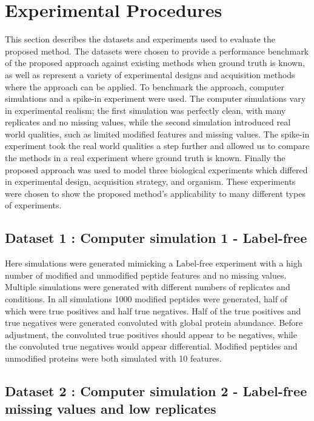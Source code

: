 \documentclass[mcp]{article}
\numberwithin{table}{section}
\begin{document}
\section{Experimental Procedures}

This section describes the datasets and experiments used to evaluate the proposed method. The datasets were chosen to provide a performance benchmark of the proposed approach against existing methods when ground truth is known, as well as represent a variety of experimental designs and acquisition methods where the approach can be applied. To benchmark the approach, computer simulations and a spike-in experiment were used. The computer simulations vary in experimental realism; the first simulation was perfectly clean, with many replicates and no missing values, while the second simulation introduced real world qualities, such as limited modified features and missing values. The spike-in experiment took the real world qualities a step further and allowed us to compare the methods in a real experiment where ground truth is known. Finally the proposed approach was used to model three biological experiments which differed in experimental design, acquisition strategy, and organism. These experiments were chosen to show the proposed method's applicability to many different types of experiments. 

\subsection*{Dataset 1 : Computer simulation 1 - Label-free}
\label{sec:comp_sim_procedure1}

Here simulations were generated mimicking a Label-free experiment with a high number of modified and unmodified peptide features and no missing values. Multiple simulations were generated with different numbers of replicates and conditions. In all simulations 1000 modified peptides were generated, half of which were true positives and half true negatives. Half of the true positives and true negatives were generated convoluted with global protein abundance. Before adjustment, the convoluted true positives should appear to be negatives, while the convoluted true negatives would appear differential. Modified peptides and unmodified proteins were both simulated with 10 features.

\subsection*{Dataset 2 : Computer simulation 2 - Label-free missing values and low replicates}
\label{sec:comp_sim_procedure2}
\end{document}
